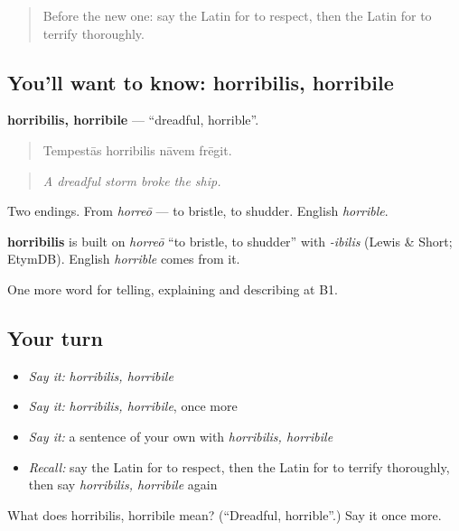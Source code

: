 \begin{quote}
Before the new one: say the Latin for to respect, then the Latin for to terrify thoroughly.
\end{quote}

\subsection*{You'll want to know: horribilis, horribile}
\textbf{horribilis, horribile} — \textquotedblleft{}dreadful, horrible\textquotedblright{}.

\begin{quote}
Tempestās horribilis nāvem frēgit.
\end{quote}

\begin{quote}
\emph{A dreadful storm broke the ship.}
\end{quote}

Two endings. From \emph{horreō} — to bristle, to shudder. English \emph{horrible}.

\begin{cousinweb}
\textbf{horribilis} is built on \emph{horreō} \textquotedblleft{}to bristle, to shudder\textquotedblright{} with \emph{-ibilis} (Lewis \& Short; EtymDB). English \emph{horrible} comes from it.
\end{cousinweb}

\begin{grammarlens}[title={What you've built}]
One more word for telling, explaining and describing at B1.
\end{grammarlens}

\subsection*{Your turn}
\begin{itemize}
\raggedright
  \item \emph{Say it:} \emph{horribilis, horribile}
  \item \emph{Say it:} \emph{horribilis, horribile}, once more
  \item \emph{Say it:} a sentence of your own with \emph{horribilis, horribile}
  \item \emph{Recall:} say the Latin for to respect, then the Latin for to terrify thoroughly, then say \emph{horribilis, horribile} again
\end{itemize}

\begin{tcolorbox}[breakable,colback=teal!4,colframe=teal!35!black,title={Before you move on}]
What does horribilis, horribile mean? (\textquotedblleft{}Dreadful, horrible\textquotedblright{}.) Say it once more.
\end{tcolorbox}
